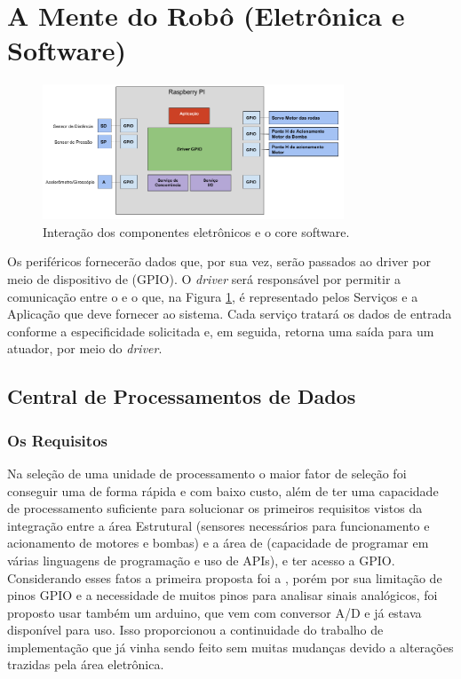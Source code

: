 \section{A Mente do Robô (Eletrônica e Software)}
\par
\begin{figure}[h]
  \centering
  \includegraphics[width=0.8\textwidth]{figures/schema-eletro-soft.png}
  \caption{Interação dos componentes eletrônicos e o core software.}
  \label{fig:schema-eletro-soft}
\end{figure}
\FloatBarrier
\par
Os periféricos fornecerão dados que, por sua vez, serão passados ao driver por meio de dispositivo de \hardware (GPIO). O \textit{driver} será responsável por permitir a comunicação entre o \hardware e o \software que, na Figura \ref{fig:schema-eletro-soft}, é representado pelos Serviços e a Aplicação que deve fornecer ao sistema. Cada serviço tratará os dados de entrada conforme a especificidade solicitada e, em seguida, retorna uma saída para um atuador, por meio do \textit{driver}.

\subsection{Central de Processamentos de Dados}
\subsubsection{Os Requisitos}
Na seleção de uma unidade de processamento o maior fator de seleção foi conseguir uma de forma rápida e com baixo custo, além de ter uma capacidade de processamento suficiente para solucionar os primeiros requisitos vistos da integração entre a área Estrutural (sensores necessários para funcionamento e acionamento de motores e bombas) e a área de \software (capacidade de programar em várias linguagens de programação e uso de \textsf{APIs}), e ter acesso a GPIO. Considerando esses fatos a primeira proposta foi a \rasp, porém por sua limitação de pinos GPIO e a necessidade de muitos pinos para analisar sinais analógicos, foi proposto usar também um arduino, que vem com conversor A/D e já estava disponível para uso. Isso proporcionou a continuidade do trabalho de implementação que já vinha sendo feito sem muitas mudanças devido a alterações trazidas pela área eletrônica.


